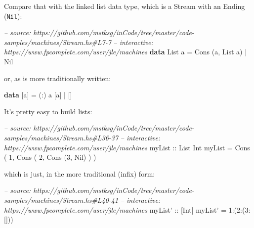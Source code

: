 \documentclass[]{article}
\newenvironment{Shaded}{\begin{snugshade}}{\end{snugshade}}
\newcommand{\CommentTok}[1]{\textcolor[rgb]{0.56,0.35,0.01}{\textit{#1}}}
\newcommand{\DataTypeTok}[1]{\textcolor[rgb]{0.13,0.29,0.53}{#1}}
\newcommand{\DecValTok}[1]{\textcolor[rgb]{0.00,0.00,0.81}{#1}}
\newcommand{\FunctionTok}[1]{\textcolor[rgb]{0.00,0.00,0.00}{#1}}
\newcommand{\KeywordTok}[1]{\textcolor[rgb]{0.13,0.29,0.53}{\textbf{#1}}}
\newcommand{\NormalTok}[1]{#1}
\newcommand{\OtherTok}[1]{\textcolor[rgb]{0.56,0.35,0.01}{#1}}
\begin{document}
Compare that with the linked list data type, which is a Stream with an Ending
(\texttt{Nil}):

\begin{Shaded}
\begin{Highlighting}[]
\CommentTok{-- source: https://github.com/mstksg/inCode/tree/master/code-samples/machines/Stream.hs#L7-7}
\CommentTok{-- interactive: https://www.fpcomplete.com/user/jle/machines}
\KeywordTok{data} \DataTypeTok{List}\NormalTok{ a }\FunctionTok{=} \DataTypeTok{Cons}\NormalTok{ (a, }\DataTypeTok{List}\NormalTok{ a) }\FunctionTok{|} \DataTypeTok{Nil}
\end{Highlighting}
\end{Shaded}

or, as is more traditionally written:

\begin{Shaded}
\begin{Highlighting}[]
\KeywordTok{data}\NormalTok{ [a] }\FunctionTok{=}\NormalTok{ (}\FunctionTok{:}\NormalTok{) a [a] }\FunctionTok{|}\NormalTok{ []}
\end{Highlighting}
\end{Shaded}

It's pretty easy to build lists:

\begin{Shaded}
\begin{Highlighting}[]
\CommentTok{-- source: https://github.com/mstksg/inCode/tree/master/code-samples/machines/Stream.hs#L36-37}
\CommentTok{-- interactive: https://www.fpcomplete.com/user/jle/machines}
\OtherTok{myList ::} \DataTypeTok{List} \DataTypeTok{Int}
\NormalTok{myList }\FunctionTok{=} \DataTypeTok{Cons}\NormalTok{ ( }\DecValTok{1}\NormalTok{, }\DataTypeTok{Cons}\NormalTok{ ( }\DecValTok{2}\NormalTok{, }\DataTypeTok{Cons}\NormalTok{ (}\DecValTok{3}\NormalTok{, }\DataTypeTok{Nil}\NormalTok{) ) )}
\end{Highlighting}
\end{Shaded}

which is just, in the more traditional (infix) form:

\begin{Shaded}
\begin{Highlighting}[]
\CommentTok{-- source: https://github.com/mstksg/inCode/tree/master/code-samples/machines/Stream.hs#L40-41}
\CommentTok{-- interactive: https://www.fpcomplete.com/user/jle/machines}
\OtherTok{myList' ::}\NormalTok{ [}\DataTypeTok{Int}\NormalTok{]}
\NormalTok{myList' }\FunctionTok{=} \DecValTok{1}\FunctionTok{:}\NormalTok{(}\DecValTok{2}\FunctionTok{:}\NormalTok{(}\DecValTok{3}\FunctionTok{:}\NormalTok{[]))}
\end{Highlighting}
\end{Shaded}
\end{document}
